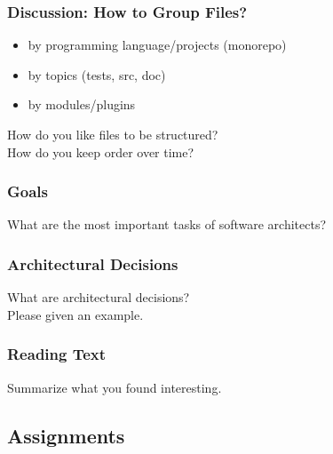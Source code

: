 
\begin{assignment}
	\frametitle{Discussion: How to Group Files?}

	\begin{itemize}
	\item by programming language/projects (monorepo)
	\item by topics (tests, src, doc)
	\item by modules/plugins
	\end{itemize}

	\begin{task}
	How do you like files to be structured? \\
	How do you keep order over time?
	\end{task}
\end{assignment}

\breakframe


\begin{assignment}
	\frametitle{Goals}

	\begin{task}
	What are the most important tasks of software architects?
	\end{task}
\end{assignment}


\begin{assignment}
	\frametitle{Architectural Decisions}

	\begin{task}
	What are architectural decisions? \\
	Please given an example.
	\end{task}
\end{assignment}


\begin{assignment}
	\frametitle{Reading Text}

	\begin{task}
	Summarize what you found interesting.
	\end{task}
\end{assignment}

\breakframe


\subsection{Assignments}

